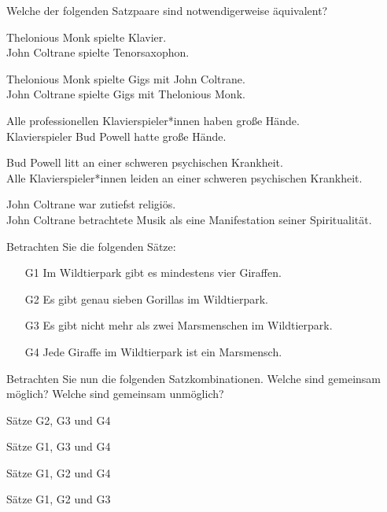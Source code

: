 \problempart Welche der folgenden Satzpaare sind notwendigerweise äquivalent?

\begin{earg}
\item  Thelonious Monk spielte Klavier.	\\
	John Coltrane spielte Tenorsaxophon. 
\item  Thelonious Monk spielte Gigs mit John Coltrane.	\\
	John Coltrane spielte Gigs mit Thelonious Monk.
\item  Alle professionellen Klavierspieler*innen haben gro{\ss}e Hände.	\\
	Klavierspieler Bud Powell hatte gro{\ss}e Hände.
\item  Bud Powell litt an einer schweren psychischen Krankheit.	 \\
	Alle Klavierspieler*innen leiden an einer schweren psychischen Krankheit.
\item John Coltrane war zutiefst religiös. \\
John Coltrane betrachtete Musik als eine Manifestation seiner Spiritualität. 
\end{earg}

\noindent 
\problempart Betrachten Sie die folgenden Sätze: 
\begin{enumerate}%
\item[G1] \label{itm:at_least_four} Im Wildtierpark gibt es mindestens vier Giraffen.
\item[G2] \label{itm:exactly_seven} Es gibt genau sieben Gorillas im Wildtierpark.
\item[G3] \label{itm:not_more_than_two} Es gibt nicht mehr als zwei Marsmenschen im Wildtierpark.
\item[G4] \label{itm:martians} Jede Giraffe im Wildtierpark ist ein Marsmensch.
\end{enumerate}

Betrachten Sie nun die folgenden Satzkombinationen. Welche sind gemeinsam möglich? Welche sind gemeinsam unmöglich?
\begin{earg}
\item Sätze G2, G3 und G4
\item Sätze G1, G3 und G4
\item Sätze G1, G2 und G4
\item Sätze G1, G2 und G3
\end{earg}

